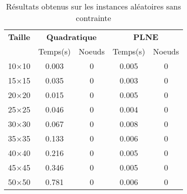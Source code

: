 \documentclass[main.tex]{subfiles}
\begin{document}
\thispagestyle{empty}

\begin{table}[h]
    \centering
    \begin{tabular}{ccccc}
	\hline	
	\textbf{Taille} &\multicolumn{2}{c}{\textbf{Quadratique}} &\multicolumn{2}{c}{\textbf{PLNE}}\\
	 &Temps(s) &Noeuds &Temps(s) &Noeuds\\

\hline
	10$\times$10 &0.003 &0 &0.005 &0\\
	15$\times$15 &0.035 &0 &0.003 &0\\
	20$\times$20 &0.015 &0 &0.005 &0\\
	25$\times$25 &0.046 &0 &0.004 &0\\
	30$\times$30 &0.067 &0 &0.008 &0\\
	35$\times$35 &0.133 &0 &0.006 &0\\
	40$\times$40 &0.216 &0 &0.005 &0\\
	45$\times$45 &0.346 &0 &0.005 &0\\
	50$\times$50 &0.781 &0 &0.006 &0\\
\end{tabular}\caption{Résultats obtenus sur les instances aléatoires sans contrainte}
\end{table}
\end{document}

